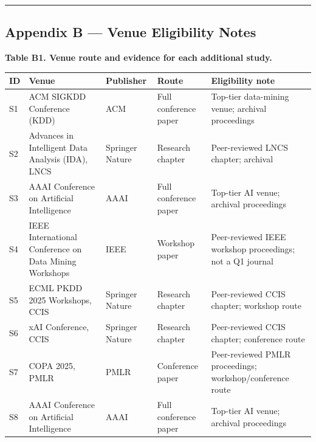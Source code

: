 \documentclass[
]{article}
\begin{document}
\begin{center}\rule{0.5\linewidth}{0.5pt}\end{center}

\hypertarget{appendix-b-venue-eligibility-notes}{%
\subsection{Appendix B --- Venue Eligibility
Notes}\label{appendix-b-venue-eligibility-notes}}

\textbf{Table B1. Venue route and evidence for each additional study.}

\begin{longtable}[]{@{}
  >{\raggedright\arraybackslash}p{}
  >{\raggedright\arraybackslash}p{}
  >{\raggedright\arraybackslash}p{}
  >{\raggedright\arraybackslash}p{}
  >{\raggedright\arraybackslash}p{}@{}}
\toprule
ID & Venue & Publisher & Route & Eligibility note \\
\midrule
\endhead
S1 & ACM SIGKDD Conference (KDD) & ACM & Full conference paper &
Top-tier data-mining venue; archival proceedings \\
S2 & Advances in Intelligent Data Analysis (IDA), LNCS & Springer Nature
& Research chapter & Peer-reviewed LNCS chapter; archival \\
S3 & AAAI Conference on Artificial Intelligence & AAAI & Full conference
paper & Top-tier AI venue; archival proceedings \\
S4 & IEEE International Conference on Data Mining Workshops & IEEE &
Workshop paper & Peer-reviewed IEEE workshop proceedings; not a Q1
journal \\
S5 & ECML PKDD 2025 Workshops, CCIS & Springer Nature & Research chapter
& Peer-reviewed CCIS chapter; workshop route \\
S6 & xAI Conference, CCIS & Springer Nature & Research chapter &
Peer-reviewed CCIS chapter; conference route \\
S7 & COPA 2025, PMLR & PMLR & Conference paper & Peer-reviewed PMLR
proceedings; workshop/conference route \\
S8 & AAAI Conference on Artificial Intelligence & AAAI & Full conference
paper & Top-tier AI venue; archival proceedings \\
\bottomrule
\end{longtable}
\end{document}

